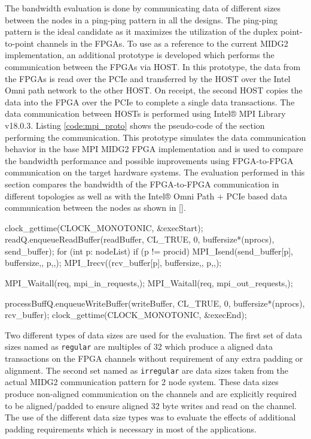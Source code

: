 The bandwidth evaluation is done by communicating data of different
sizes between the nodes in a ping-ping pattern in all the designs.
The ping-ping pattern is the ideal candidate as it maximizes
the utilization of the duplex point-to-point channels in the
FPGAs. To use as a reference to the current MIDG2 implementation,
an additional prototype is developed which performs the communication
between the FPGAs via HOST. In this prototype, the data from the FPGAs
is read over the PCIe and transferred by the HOST over the Intel
Omni path network to the other HOST. On receipt, the second HOST
copies the data into the FPGA over the PCIe to complete a single data
transactions. The data communication between HOSTs is performed using
Intel® MPI Library v18.0.3. Listing \ref{code:mpi_proto} shows the pseudo-code of the section
performing the communication. This prototype simulates the data communication
behavior in the base MPI MIDG2 FPGA implementation and is used to compare the
bandwidth performance and possible improvements using FPGA-to-FPGA communication
on the target hardware systems. The evaluation performed in this
section compares the bandwidth of the FPGA-to-FPGA communication
in  different topologies as well as with the Intel® Omni Path + PCIe based
data communication between the nodes as shown in \ref{}.

\begin{CppCode}[caption=Pseudo-code to perform MPI+PCIe based data communication
    between FPGAs, frame=tlrb, label=code:mpi_proto]
clock_gettime(CLOCK_MONOTONIC, &execStart);
readQ.enqueueReadBuffer(readBuffer, CL_TRUE, 0, buffersize*(nprocs), send_buffer);
for (int p: nodeList)
{
    if (p != procid)
    {
        MPI_Isend(send_buffer[p], buffersize,, p,,);
        MPI_Irecv((rcv_buffer[p], buffersize,, p,,);
    }
}

MPI_Waitall(req, mpi_in_requests,);
MPI_Waitall(req, mpi_out_requests,);

processBuffQ.enqueueWriteBuffer(writeBuffer, CL_TRUE, 0, buffersize*(nprocs), rcv_buffer);
clock_gettime(CLOCK_MONOTONIC, &execEnd);
\end{CppCode}

Two different types of data sizes are used for the evaluation. The first set of data
sizes named as \texttt{regular} are multiples of 32 which produce a aligned data transactions
on the FPGA channels without requirement of any extra padding or alignment.
The second set named as \texttt{irregular} are data sizes taken from the actual
MIDG2 communication pattern for 2 node system. These data sizes produce
non-aligned communication on the channels and are explicitly required to be
aligned/padded to ensure aligned 32 byte writes and read on the channel.
The use of the different data size types was to evaluate the effects of additional
padding requirements which is necessary in most of the applications.

